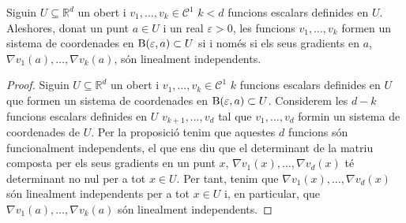 \documentclass[../Apunts.tex]{subfiles}
\begin{document}
\begin{proposition}
	\end{proposition}
	\begin{theorem}\label{thm:sistema de coordenades en un entorn iff gradients linealment independents}
		Siguin \(U\subseteq\mathbb{R}^{d}\) un obert i \(v_{1},\dots,v_{k}\in\mathcal{C}^{1}\) \(k<d\) funcions escalars definides en \(U\). Aleshores, donat un punt \(a\in U\) i un real \(\varepsilon>0\), les funcions \(v_{1},\dots,v_{k}\) formen un sistema de coordenades en \(\operatorname{B}(\varepsilon,a)\subset U\) si i només si els seus gradients en \(a\), \(\nabla v_{1}(a),\dots,\nabla v_{k}(a)\), són linealment independents.
		\begin{proof}
			Siguin \(U\subseteq\mathbb{R}^{d}\) un obert i \(v_{1},\dots,v_{k}\in\mathcal{C}^{1}\) \(k\) funcions escalars definides en \(U\) que formen un sistema de coordenades en \(\operatorname{B}(\varepsilon,a)\subset U\). Considerem les \(d-k\) funcions escalars definides en \(U\) \(v_{k+1},\dots,v_{d}\) tal que \(v_{1},\dots,v_{d}\) formin un sistema de coordenades de \(U\). Per la proposició  tenim que aquestes \(d\) funcions són funcionalment independents, el que ens diu que el determinant de la matriu composta per els seus gradients en un punt \(x\), \(\nabla v_{1}(x),\dots,\nabla v_{d}(x)\) té determinant no nul per a tot \(x\in U\). Per tant, tenim que \(\nabla v_{1}(x),\dots,\nabla v_{d}(x)\) són linealment independents per a tot \(x\in U\) i, en particular, que \(\nabla v_{1}(a),\dots,\nabla v_{k}(a)\) són linealment independents. %
		\end{proof}
	\end{theorem}
\end{document}
